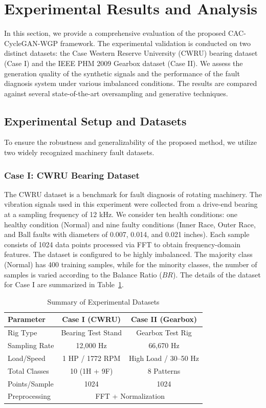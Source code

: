 \section{Experimental Results and Analysis}
\label{sec:experiments}

In this section, we provide a comprehensive evaluation of the proposed CAC-CycleGAN-WGP framework. The experimental validation is conducted on two distinct datasets: the Case Western Reserve University (CWRU) bearing dataset (Case I) and the IEEE PHM 2009 Gearbox dataset (Case II). We assess the generation quality of the synthetic signals and the performance of the fault diagnosis system under various imbalanced conditions. The results are compared against several state-of-the-art oversampling and generative techniques.

\subsection{Experimental Setup and Datasets}
To ensure the robustness and generalizability of the proposed method, we utilize two widely recognized machinery fault datasets.

\subsubsection{Case I: CWRU Bearing Dataset}
The CWRU dataset is a benchmark for fault diagnosis of rotating machinery. The vibration signals used in this experiment were collected from a drive-end bearing at a sampling frequency of 12 kHz. We consider ten health conditions: one healthy condition (Normal) and nine faulty conditions (Inner Race, Outer Race, and Ball faults with diameters of 0.007, 0.014, and 0.021 inches). Each sample consists of 1024 data points processed via FFT to obtain frequency-domain features. The dataset is configured to be highly imbalanced. The majority class (Normal) has 400 training samples, while for the minority classes, the number of samples is varied according to the Balance Ratio ($BR$). The details of the dataset for Case I are summarized in Table~\ref{tab:datasets}.

\begin{table}[htbp]
\centering
\caption{Summary of Experimental Datasets}
\label{tab:datasets}
\begin{tabular}{lcc}
\hline
\textbf{Parameter} & \textbf{Case I (CWRU)} & \textbf{Case II (Gearbox)} \\ \hline
Rig Type & Bearing Test Stand & Gearbox Test Rig \\
Sampling Rate & 12,000 Hz & 66,670 Hz \\
Load/Speed & 1 HP / 1772 RPM & High Load / 30--50 Hz \\
Total Classes & 10 (1H + 9F) & 8 Patterns \\
Points/Sample & 1024 & 1024 \\
Preprocessing & \multicolumn{2}{c}{FFT + Normalization} \\
\hline
\end{tabular}
\end{table}

